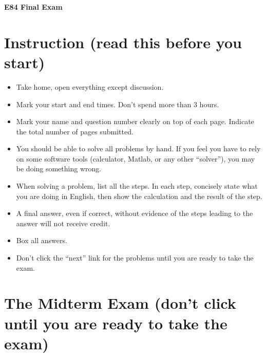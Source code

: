 \usepackage{html}

\begin{center}
{\Large \bf E84 Final Exam}
\end{center}

\section*{Instruction (read this before you start)}

\begin{itemize}
\item Take home, open everything except discussion. 
\item Mark your start and end times. Don't spend more than 3 hours.
\item Mark your name and question number clearly on top of each page.
  Indicate the total number of pages submitted.
\item You should be able to solve all problems by hand. If you feel you 
  have to rely on some software tools (calculator, Matlab, or any other
  ``solver''), you may be doing something wrong.
\item When solving a problem, list all the steps. In each step, concisely
  state what you are doing in English, then show the calculation and the 
  result of the step. 
\item A final answer, even if correct, without evidence of the steps 
  leading to the answer will not receive credit.
\item Box all answers.
\item Don't click the ``next'' link for the problems until you are ready 
  to take the exam.
\end{itemize}

\section*{The Midterm Exam (don't click until you are ready to take the exam)}

